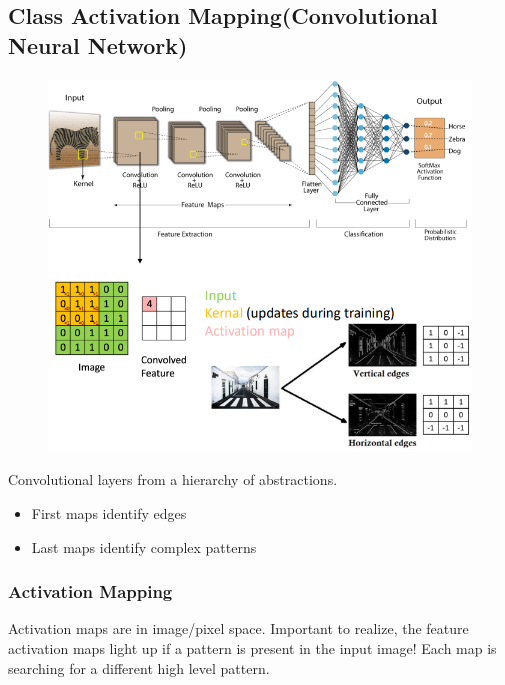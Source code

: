 \subsection{Class Activation Mapping(Convolutional Neural Network)}
\begin{figure}[!h]
    \includegraphics[width =  \columnwidth]{figures/XAI2/CAMCNN.png}
\end{figure}
Convolutional layers from a hierarchy of abstractions.
\begin{itemize}
    \item First maps identify edges
    \item Last maps identify complex patterns
\end{itemize}
\subsubsection{Activation Mapping}
Activation maps are in image/pixel space.
Important to realize, the feature activation maps light up if a pattern is present in the input image!
Each map is searching for a different high level pattern.

